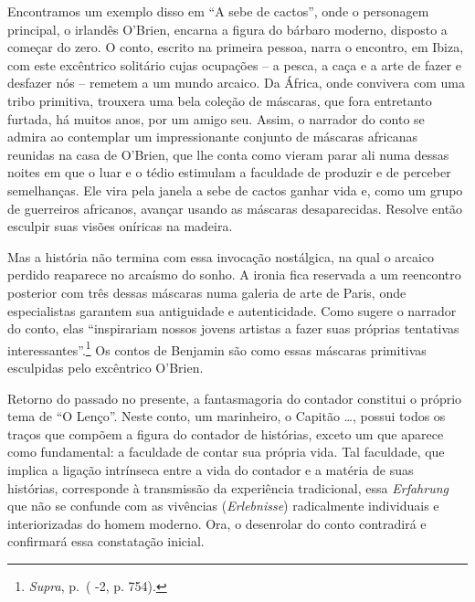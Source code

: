 Encontramos um exemplo disso em ``A sebe de cactos'', onde o personagem
principal, o irlandês O'Brien, encarna a figura do bárbaro moderno,
disposto a começar do zero. O conto, escrito na primeira pessoa, narra o
encontro, em Ibiza, com este excêntrico solitário cujas ocupações -- a
pesca, a caça e a arte de fazer e desfazer nós -- remetem a um mundo
arcaico. Da África, onde convivera com uma tribo primitiva, trouxera uma
bela coleção de máscaras, que fora entretanto furtada, há muitos anos,
por um amigo seu. Assim, o narrador do conto se admira ao contemplar um
impressionante conjunto de máscaras africanas reunidas na casa de
O'Brien, que lhe conta como vieram parar ali numa dessas noites em que o
luar e o tédio estimulam a faculdade de produzir e de perceber
semelhanças. Ele vira pela janela a sebe de cactos ganhar vida e, como
um grupo de guerreiros africanos, avançar usando as máscaras
desaparecidas. Resolve então esculpir suas visões oníricas na madeira.

Mas a história não termina com essa invocação nostálgica, na qual o
arcaico perdido reaparece no arcaísmo do sonho. A ironia fica reservada
a um reencontro posterior com três dessas máscaras numa galeria de arte
de Paris, onde especialistas garantem sua antiguidade e autenticidade.
Como sugere o narrador do conto, elas ``inspirariam nossos jovens artistas a
fazer suas próprias tentativas interessantes''.\footnote{\emph{Supra},
  p.\,\pageref{supra8} ( -2, p. 754).} Os contos de Benjamin são como essas máscaras
primitivas esculpidas pelo excêntrico O'Brien.

Retorno do passado no presente, a fantasmagoria do contador constitui o
próprio tema de ``O Lenço''. Neste conto, um marinheiro, o Capitão \ldots{},
possui todos os traços que compõem a figura do contador de histórias,
exceto um que aparece como fundamental: a faculdade de contar sua
própria vida. Tal faculdade, que implica a ligação intrínseca entre a
vida do contador e a matéria de suas histórias, corresponde à
transmissão da experiência tradicional, essa \emph{Erfahrung} que não se
confunde com as vivências (\emph{Erlebnisse}) radicalmente individuais e
interiorizadas do homem moderno. Ora, o desenrolar do conto contradirá e
confirmará essa constatação inicial.

